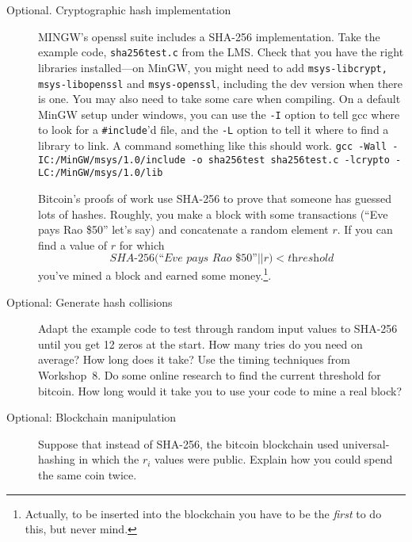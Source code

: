 \documentclass[11pt]{article}
\newcommand{\concat}{||}
\begin{document}
\begin{description}
\item[Optional.  Cryptographic hash implementation]
    MINGW's openssl suite includes a SHA-256 implementation.
        Take the example code,
        {\tt sha256test.c} from the {LMS}.
        Check that you have the right libraries installed---on MinGW,
        you might need to add {\tt msys-libcrypt, msys-libopenssl} and
        {\tt msys-openssl},
        including the dev version when there is one.
        You may also need to take some care when compiling.
        On a default MinGW setup under windows,
        you can use the {\tt -I} option to tell gcc where to look for a {\tt \#include}'d file,
        and the {\tt -L} option to tell it where to find a library to link.
        A command something like this should work.
        {\tt gcc -Wall -IC:/MinGW/msys/1.0/include -o sha256test sha256test.c -lcrypto -LC:/MinGW/msys/1.0/lib}

Bitcoin's proofs of work use SHA-256 to prove that someone has guessed lots of hashes.
        Roughly, you make a block with some transactions (``Eve pays Rao \$50'' let's say) and concatenate a random element $r$.
        If you can find a value of $r$ for which
        $$\textit{SHA-256(``Eve pays Rao \$50''} \concat r) < \textit{threshold}$$
        you've mined a block and earned some money.\footnote{Actually, to be inserted into the blockchain you have to be the \emph{first} to do this, but never mind.}.

\item[Optional: Generate hash collisions]
    Adapt the example code to test through random input values to SHA-256 until you get 12 zeros at the start.
        How many tries do you need on average?
        How long does it take?
        Use the timing techniques from Workshop~8.
        Do some online research to find the current threshold for bitcoin.
        How long would it take you to use your code to mine a real block?

\item[Optional: Blockchain manipulation]  Suppose that instead of SHA-256,
    the bitcoin blockchain used universal-hashing in which the $r_i$ values were public.
        Explain how you could spend the same coin twice.


\end{description}
\end{document}
